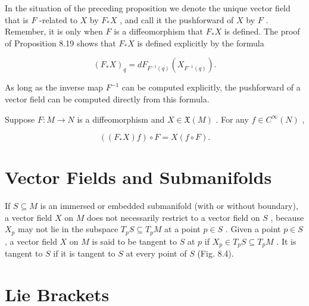 \begin{definition}
\label{def:8-57-extra-2}
\mathlibok
{}
In the situation of the preceding proposition we denote the unique vector field that is $F$ -related to $X$ by ${F}_{ * }X$ , and call it the pushforward of $X$ by $F$ . Remember, it is only when $F$ is a diffeomorphism that ${F}_{ * }X$ is defined. The proof of Proposition 8.19 shows that ${F}_{ * }X$ is defined explicitly by the formula

\[
{\left( {F}_{ * }X\right) }_{q} = d{F}_{{F}^{-1}\left( q\right) }\left( {X}_{{F}^{-1}\left( q\right) }\right) . \tag{8.7}
\]

As long as the inverse map ${F}^{-1}$ can be computed explicitly, the pushforward of a vector field can be computed directly from this formula.
\end{definition}

\begin{corollary}
\label{cor:8-21}
\leanok
{}
Suppose $F : M \rightarrow  N$ is a diffeomorphism and $X \in  \mathfrak{X}\left( M\right)$ . For any $f \in  {C}^{\infty }\left( N\right)$ ,

\[
\left( {\left( {{F}_{ * }X}\right) f}\right)  \circ  F = X\left( {f \circ  F}\right) .
\]
\end{corollary}


\section{Vector Fields and Submanifolds}

\begin{definition}
\label{def:8-58-extra-1}
\leanok
If $S \subseteq  M$ is an immersed or embedded submanifold (with or without boundary), a vector field $X$ on $M$ does not necessarily restrict to a vector field on $S$ , because ${X}_{p}$ may not lie in the subspace ${T}_{p}S \subseteq  {T}_{p}M$ at a point $p \in  S$ . Given a point $p \in  S$ , a vector field $X$ on $M$ is said to be tangent to $S$ at $p$ if ${X}_{p} \in  {T}_{p}S \subseteq  {T}_{p}M$ . It is tangent to $S$ if it is tangent to $S$ at every point of $S$ (Fig. 8.4).
\end{definition}


\section{Lie Brackets}

